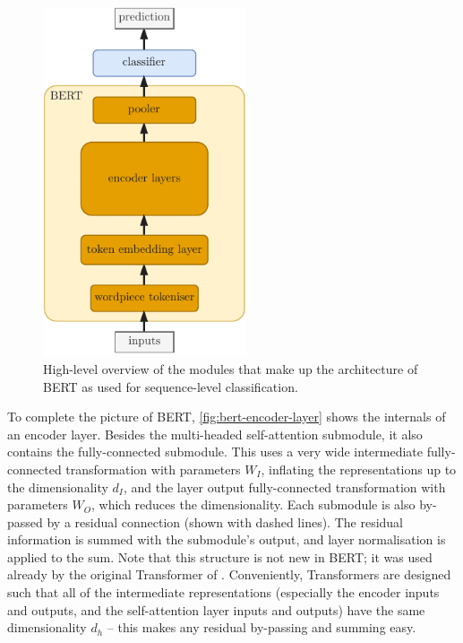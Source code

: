 \documentclass[bsc,frontabs,singlespacing,parskip,deptreport]{infthesis}
\begin{document}
{{{      \begin{figure}[h!t]
        \centering
        \includegraphics[width=6cm]{graphics/bert-hl}
        \caption{High-level overview of the modules that make up the architecture of BERT as used for sequence-level classification.}
        \label{fig:bert-hl}
      \end{figure}

      To complete the picture of BERT, \autoref{fig:bert-encoder-layer} shows the internals of an encoder layer. Besides the multi-headed self-attention submodule, it also contains the fully-connected submodule. This uses a very wide intermediate fully-connected transformation with parameters $W_I$, inflating the representations up to the dimensionality $d_I$, and the layer output fully-connected transformation with parameters $W_O$, which reduces the dimensionality. Each submodule is also by-passed by a residual connection (shown with dashed lines). The residual information is summed with the submodule's output, and layer normalisation is applied to the sum. Note that this structure is not new in BERT; it was used already by the original Transformer of \citet{Vaswani_2017}. Conveniently, Transformers are designed such that all of the intermediate representations (especially the encoder inputs and outputs, and the self-attention layer inputs and outputs) have the same dimensionality $d_h$ -- this makes any residual by-passing and summing easy.

}}}
\end{document}
